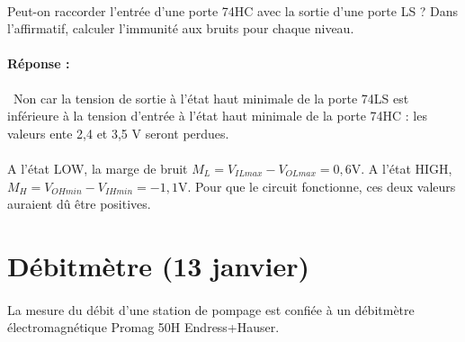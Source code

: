 \documentclass{article}
\begin{document}
\paragraph{}
Peut-on raccorder l'entrée d'une porte 74HC avec la sortie d'une porte LS ? Dans l'affirmatif, calculer l'immunité aux bruits pour chaque niveau.

\paragraph{Réponse :}
\
Non car la tension de sortie à l'état haut minimale de la porte 74LS est inférieure à la tension d'entrée à l'état haut minimale de la porte 74HC : les valeurs ente 2,4 et 3,5 \si{\volt} seront perdues.

\paragraph{}A l'état LOW, la marge de bruit $M_L = V_{ILmax} - V_{OLmax} = 0,6 \si{\volt}$. A l'état HIGH, $M_H = V_{OHmin} - V_{IHmin} = -1,1 \si{\volt}$. Pour que le circuit fonctionne, ces deux valeurs auraient dû être positives.


\newpage
\section{Débitmètre (13 janvier)}
\paragraph{}
La mesure du débit d'une station de pompage est confiée à un débitmètre électromagnétique Promag 50H Endress+Hauser.
\end{document}
